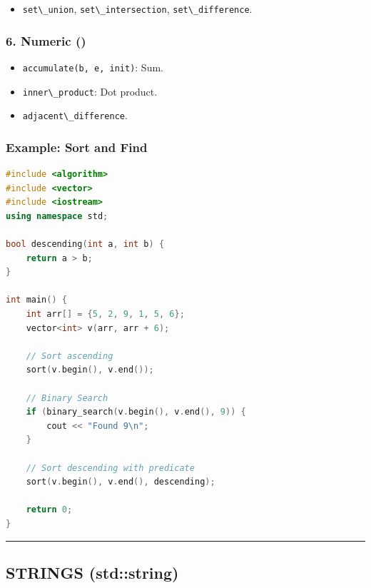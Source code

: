 \begin{itemize}
\tightlist
\item
  \passthrough{\lstinline!set\_union!},
  \passthrough{\lstinline!set\_intersection!},
  \passthrough{\lstinline!set\_difference!}.
\end{itemize}

\hypertarget{numeric}{%
\subsubsection{6. Numeric ()}\label{numeric}}

\begin{itemize}
\tightlist
\item
  \passthrough{\lstinline!accumulate(b, e, init)!}: Sum.
\item
  \passthrough{\lstinline!inner\_product!}: Dot product.
\item
  \passthrough{\lstinline!adjacent\_difference!}.
\end{itemize}

\hypertarget{example-sort-and-find}{%
\subsubsection{Example: Sort and Find}\label{example-sort-and-find}}

\begin{lstlisting}[language={C++}]
#include <algorithm>
#include <vector>
#include <iostream>
using namespace std;

bool descending(int a, int b) {
    return a > b;
}

int main() {
    int arr[] = {5, 2, 9, 1, 5, 6};
    vector<int> v(arr, arr + 6);

    // Sort ascending
    sort(v.begin(), v.end());

    // Binary Search
    if (binary_search(v.begin(), v.end(), 9)) {
        cout << "Found 9\n";
    }

    // Sort descending with predicate
    sort(v.begin(), v.end(), descending);

    return 0;
}
\end{lstlisting}

\begin{center}\rule{0.5\linewidth}{0.5pt}\end{center}

\hypertarget{strings-stdstring}{%
\subsection{STRINGS (std::string)}\label{strings-stdstring}}

